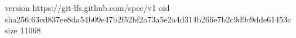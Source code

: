 version https://git-lfs.github.com/spec/v1
oid sha256:63cd837ee8da54b09e47b2f52bf2a73a5e2a4d314b266e7b2c9d9c9dde61453c
size 11068
